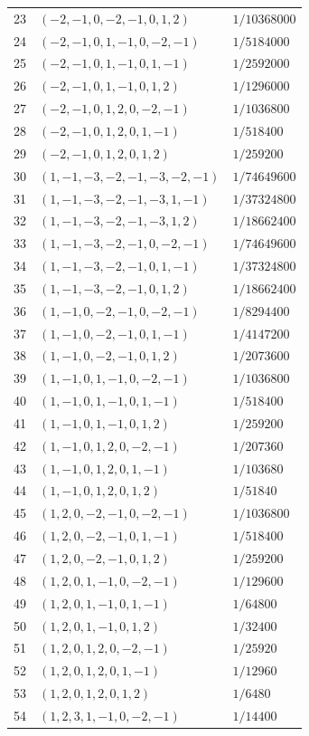 \begin{longtable}{@{}rll@{}}
23 & $(-2,-1,0,-2,-1,0,1,2)$ & $1/10368000$\\
24 & $(-2,-1,0,1,-1,0,-2,-1)$ & $1/5184000$\\
25 & $(-2,-1,0,1,-1,0,1,-1)$ & $1/2592000$\\
26 & $(-2,-1,0,1,-1,0,1,2)$ & $1/1296000$\\
27 & $(-2,-1,0,1,2,0,-2,-1)$ & $1/1036800$\\
28 & $(-2,-1,0,1,2,0,1,-1)$ & $1/518400$\\
29 & $(-2,-1,0,1,2,0,1,2)$ & $1/259200$\\
30 & $(1,-1,-3,-2,-1,-3,-2,-1)$ & $1/74649600$\\
31 & $(1,-1,-3,-2,-1,-3,1,-1)$ & $1/37324800$\\
32 & $(1,-1,-3,-2,-1,-3,1,2)$ & $1/18662400$\\
33 & $(1,-1,-3,-2,-1,0,-2,-1)$ & $1/74649600$\\
34 & $(1,-1,-3,-2,-1,0,1,-1)$ & $1/37324800$\\
35 & $(1,-1,-3,-2,-1,0,1,2)$ & $1/18662400$\\
36 & $(1,-1,0,-2,-1,0,-2,-1)$ & $1/8294400$\\
37 & $(1,-1,0,-2,-1,0,1,-1)$ & $1/4147200$\\
38 & $(1,-1,0,-2,-1,0,1,2)$ & $1/2073600$\\
39 & $(1,-1,0,1,-1,0,-2,-1)$ & $1/1036800$\\
40 & $(1,-1,0,1,-1,0,1,-1)$ & $1/518400$\\
41 & $(1,-1,0,1,-1,0,1,2)$ & $1/259200$\\
42 & $(1,-1,0,1,2,0,-2,-1)$ & $1/207360$\\
43 & $(1,-1,0,1,2,0,1,-1)$ & $1/103680$\\
44 & $(1,-1,0,1,2,0,1,2)$ & $1/51840$\\
45 & $(1,2,0,-2,-1,0,-2,-1)$ & $1/1036800$\\
46 & $(1,2,0,-2,-1,0,1,-1)$ & $1/518400$\\
47 & $(1,2,0,-2,-1,0,1,2)$ & $1/259200$\\
48 & $(1,2,0,1,-1,0,-2,-1)$ & $1/129600$\\
49 & $(1,2,0,1,-1,0,1,-1)$ & $1/64800$\\
50 & $(1,2,0,1,-1,0,1,2)$ & $1/32400$\\
51 & $(1,2,0,1,2,0,-2,-1)$ & $1/25920$\\
52 & $(1,2,0,1,2,0,1,-1)$ & $1/12960$\\
53 & $(1,2,0,1,2,0,1,2)$ & $1/6480$\\
54 & $(1,2,3,1,-1,0,-2,-1)$ & $1/14400$\\

\end{longtable}
